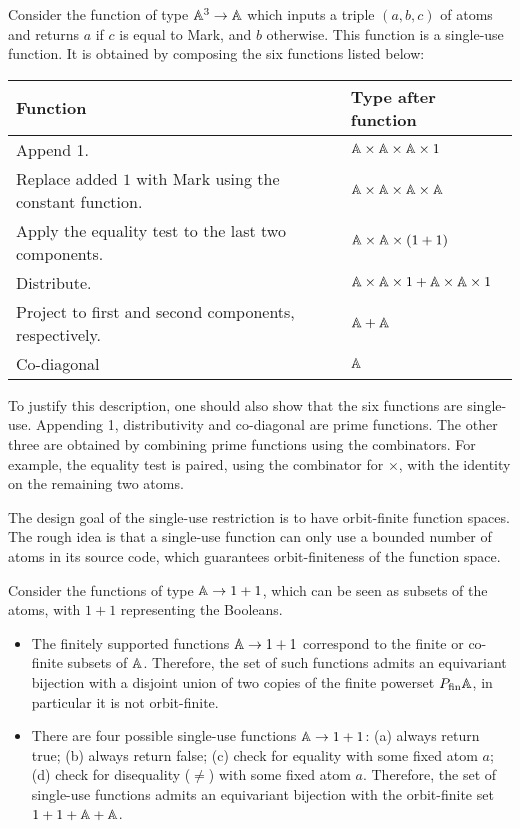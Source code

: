 \documentclass[a4paper,UKenglish,cleveref, autoref, numberwithinsect, thm-restate]{lipics-v2021}
\begin{document}
\begin{example}\label{ex:six-compositions}
    Consider the function of type $\mathbb A^3 \to \mathbb A$ which inputs a triple $(a,b,c)$ of atoms and returns $a$ if $c$ is equal to Mark, and $b$ otherwise. This function is a single-use function. It is obtained by composing the six functions listed below:
\begin{center}
    \begin{tabular}{ll}
        Function & Type after function \\
        \hline
        Append 1. & $ \mathbb A \times \mathbb A \times \mathbb A \times 1$ \\
        Replace added $1$ with Mark using the constant function. & $\mathbb A \times \mathbb A \times \mathbb A \times \mathbb A$ \\
        Apply the equality test to the last two components. & $ \mathbb A \times \mathbb A \times (1+1)$ \\
        Distribute. & $ \mathbb A \times \mathbb A \times 1 +   \mathbb A \times \mathbb A \times 1$ \\
        Project to first and second components, respectively. & $\mathbb A + \mathbb A$ \\
        Co-diagonal & $\mathbb A$ 
    \end{tabular}
\end{center}
To justify this description, one should also show that the six functions are single-use. Appending 1, distributivity and co-diagonal are prime functions. The other three are obtained by combining prime functions using the combinators. For example, the equality test is paired, using the combinator for $\times$, with the identity on the remaining two atoms. \exampleend
\end{example}

The design goal of the single-use restriction is to have orbit-finite function spaces. The rough idea is that a single-use function can only use a bounded number of atoms in its source code, which guarantees orbit-finiteness of the function space. 

\begin{example}\label{ex:first-single-use-function-space}
    Consider the functions of type $\mathbb A \to 1 + 1$, which can be seen as subsets of the atoms, with $1+1$ representing the Booleans.
    \begin{itemize}
        \item The finitely supported functions $\mathbb A \to 1 + 1$ correspond to the finite or co-finite subsets of $\mathbb A$. Therefore, the set of such functions admits an equivariant bijection with a disjoint union of two copies of the finite powerset $\powerset_{\text{fin}} \atoms$, in particular it is not orbit-finite.
        \item There are four possible single-use functions $\mathbb A\to1+1$: (a) always return true; (b) always return false; (c) check for equality with some fixed atom $a$; (d) check for disequality ($\neq$) with some fixed atom $a$.  Therefore,  the set of single-use functions  admits an equivariant bijection with the orbit-finite set $1 + 1 + \mathbb A + \mathbb A$. \exampleend
    \end{itemize}
\end{example}
\end{document}
